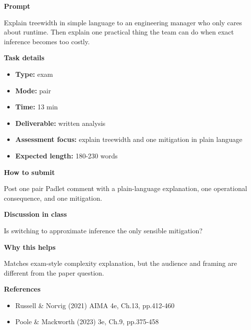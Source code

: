 \documentclass[11pt]{article}
\begin{document}
\begin{tcolorbox}[colback=white,colframe=MidnightBlue,title={Q5 Exam-Style Constructed Response},fonttitle=\bfseries,breakable]
\begin{center}
\end{center}

{\large\bfseries\color{MidnightBlue} Prompt}\par\medskip
Explain treewidth in simple language to an engineering manager who only cares about runtime. Then explain one practical thing the team can do when exact inference becomes too costly.

{\large\bfseries\color{MidnightBlue} Task details}\par\medskip
\begin{itemize}\item \textbf{Type:} exam
\item \textbf{Mode:} pair
\item \textbf{Time:} 13 min
\item \textbf{Deliverable:} written analysis
\item \textbf{Assessment focus:} explain treewidth and one mitigation in plain language
\item \textbf{Expected length:} 180-230 words\end{itemize}

{\large\bfseries\color{MidnightBlue} How to submit}\par\medskip
Post one pair Padlet comment with a plain-language explanation, one operational consequence, and one mitigation.

{\large\bfseries\color{MidnightBlue} Discussion in class}\par\medskip
Is switching to approximate inference the only sensible mitigation?

{\large\bfseries\color{MidnightBlue} Why this helps}\par\medskip
Matches exam-style complexity explanation, but the audience and framing are different from the paper question.

{\large\bfseries\color{MidnightBlue} References}\par\medskip
\begin{itemize}\item Russell \& Norvig (2021) AIMA 4e, Ch.13, pp.412-460
\item Poole \& Mackworth (2023) 3e, Ch.9, pp.375-458\end{itemize}
\end{tcolorbox}
\end{document}
